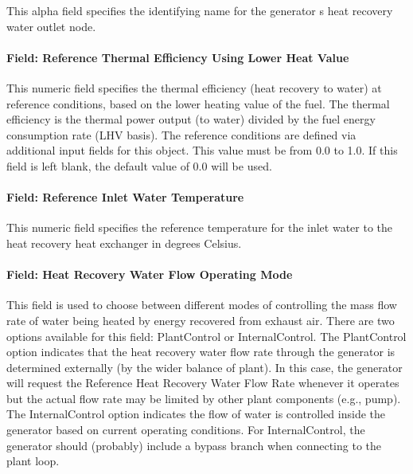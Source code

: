 This alpha field specifies the identifying name for the generator s heat recovery water outlet node.

\paragraph{Field: Reference Thermal Efficiency Using Lower Heat Value}\label{field-reference-thermal-efficiency-using-lower-heat-value}

This numeric field specifies the thermal efficiency (heat recovery to water) at reference conditions, based on the lower heating value of the fuel. The thermal efficiency is the thermal power output (to water) divided by the fuel energy consumption rate (LHV basis). The reference conditions are defined via additional input fields for this object. This value must be from 0.0 to 1.0. If this field is left blank, the default value of 0.0 will be used.

\paragraph{Field: Reference Inlet Water Temperature}\label{field-reference-inlet-water-temperature}

This numeric field specifies the reference temperature for the inlet water to the heat recovery heat exchanger in degrees Celsius.

\paragraph{Field: Heat Recovery Water Flow Operating Mode}\label{field-heat-recovery-water-flow-operating-mode}

This field is used to choose between different modes of controlling the mass flow rate of water being heated by energy recovered from exhaust air. There are two options available for this field: PlantControl or InternalControl. The PlantControl option indicates that the heat recovery water flow rate through the generator is determined externally (by the wider balance of plant). In this case, the generator will request the Reference Heat Recovery Water Flow Rate whenever it operates but the actual flow rate may be limited by other plant components (e.g., pump). The InternalControl option indicates the flow of water is controlled inside the generator based on current operating conditions. For InternalControl, the generator should (probably) include a bypass branch when connecting to the plant loop.

